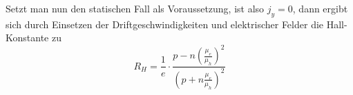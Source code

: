 Setzt man nun den statischen Fall als Voraussetzung, ist also $j_y=0$, dann ergibt sich durch Einsetzen der Driftgeschwindigkeiten und elektrischer Felder die Hall-Konstante zu
\begin{equation}
 R_H = \frac{1}{e}\cdot\frac{p-n\left(\frac{\mu_e}{\mu_h}\right)^2}{\left(p+n\frac{\mu_e}{\mu_h}\right)^2}
\end{equation}
